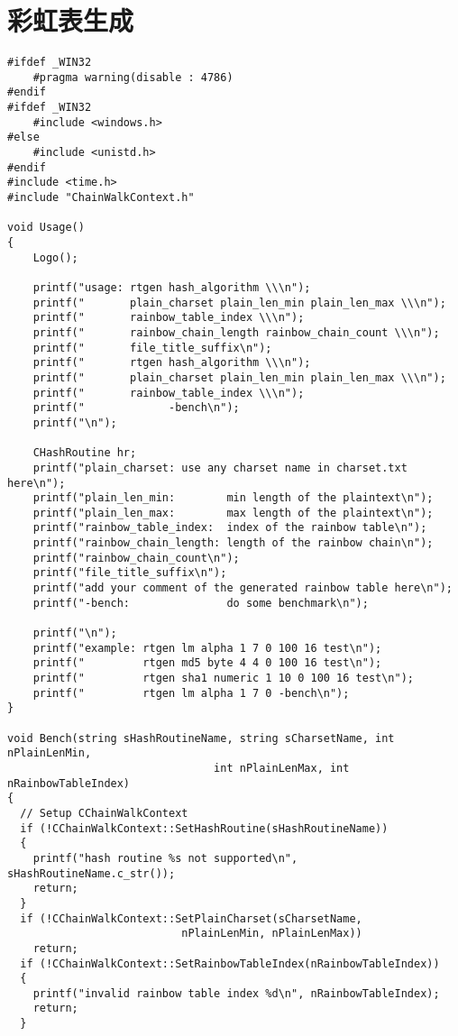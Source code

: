 \section{彩虹表生成}
\begin{lstlisting}
#ifdef _WIN32
	#pragma warning(disable : 4786)
#endif
#ifdef _WIN32
	#include <windows.h>
#else
	#include <unistd.h>
#endif
#include <time.h>
#include "ChainWalkContext.h"

void Usage()
{
	Logo();

	printf("usage: rtgen hash_algorithm \\\n");
	printf("       plain_charset plain_len_min plain_len_max \\\n");
	printf("       rainbow_table_index \\\n");
	printf("       rainbow_chain_length rainbow_chain_count \\\n");
	printf("       file_title_suffix\n");
	printf("       rtgen hash_algorithm \\\n");
	printf("       plain_charset plain_len_min plain_len_max \\\n");
	printf("       rainbow_table_index \\\n");
	printf("             -bench\n");
	printf("\n");

	CHashRoutine hr;
	printf("plain_charset: use any charset name in charset.txt here\n");
	printf("plain_len_min:        min length of the plaintext\n");
	printf("plain_len_max:        max length of the plaintext\n");
	printf("rainbow_table_index:  index of the rainbow table\n");
	printf("rainbow_chain_length: length of the rainbow chain\n");
	printf("rainbow_chain_count\n");
	printf("file_title_suffix\n");
	printf("add your comment of the generated rainbow table here\n");
	printf("-bench:               do some benchmark\n");

	printf("\n");
	printf("example: rtgen lm alpha 1 7 0 100 16 test\n");
	printf("         rtgen md5 byte 4 4 0 100 16 test\n");
	printf("         rtgen sha1 numeric 1 10 0 100 16 test\n");
	printf("         rtgen lm alpha 1 7 0 -bench\n");
}

void Bench(string sHashRoutineName, string sCharsetName, int nPlainLenMin, 
                                int nPlainLenMax, int nRainbowTableIndex)
{
  // Setup CChainWalkContext
  if (!CChainWalkContext::SetHashRoutine(sHashRoutineName))
  {
    printf("hash routine %s not supported\n", sHashRoutineName.c_str());
    return;
  }
  if (!CChainWalkContext::SetPlainCharset(sCharsetName, 
                           nPlainLenMin, nPlainLenMax))
    return;
  if (!CChainWalkContext::SetRainbowTableIndex(nRainbowTableIndex))
  {
    printf("invalid rainbow table index %d\n", nRainbowTableIndex);
    return;
  }


\end{lstlisting}
